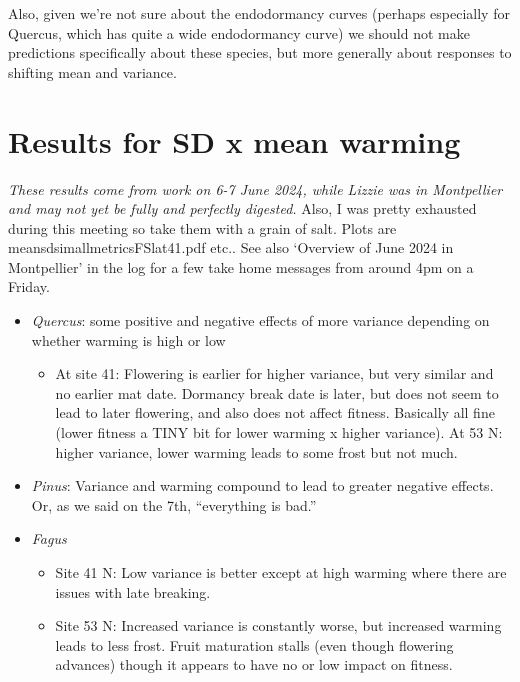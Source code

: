 \documentclass[11pt,letter]{article}
\begin{document}
Also, given we're not sure about the endodormancy curves (perhaps especially for Quercus, which has quite a wide endodormancy curve) we should not make predictions specifically about these species, but more generally about responses to shifting mean and variance. 

\section{Results for SD x mean warming}
\emph{These results come from work on 6-7 June 2024, while Lizzie was in Montpellier and may not yet be fully and perfectly digested.} Also, I was pretty exhausted during this meeting so take them with a grain of salt. Plots are meansdsimallmetricsFSlat41.pdf etc.. See also `Overview of June 2024 in Montpellier' in the log for a few take home messages from around 4pm on a Friday. 

\begin{itemize}
\item \emph{Quercus}: some positive and negative effects of more variance depending on whether warming is high or low
\begin{itemize}
\item At site 41: Flowering is earlier for higher variance, but very similar and no earlier mat date. Dormancy break date is later, but does not seem to lead to later flowering, and also does not affect fitness. Basically all fine (lower fitness a TINY bit for lower warming x higher variance).  At 53 N: higher variance, lower warming leads to some frost but not much.
\end{itemize}
\item \emph{Pinus}: Variance and warming compound to lead to greater negative effects. Or, as we said on the 7th, ``everything is bad.''
\item \emph{Fagus}
\begin{itemize}
\item Site 41 N: Low variance is better except at high warming where there are issues with late breaking.
\item Site 53 N: Increased variance is constantly worse, but increased warming leads to less frost. Fruit maturation stalls (even though flowering advances) though it appears to have no or low impact on fitness. 
\end{itemize}
\end{itemize}
\end{document}
